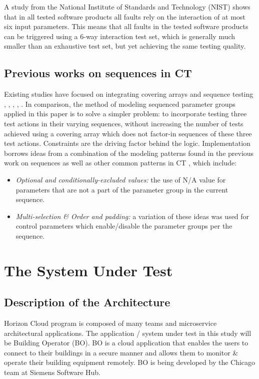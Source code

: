 \documentclass[conference]{IEEEtran}
\begin{document}
	A study from the National Institute of Standards and Technology (NIST) \cite{NISTpractical} shows
	that in all tested software products all faults rely on the interaction of at most six input parameters.
	This means that all faults in the tested software products can be triggered using a $6$-way interaction test set,
	which is generally much smaller than an exhaustive test set, but yet achieving the same testing quality.

	\subsection{Previous works on sequences in CT} \label{Previous works on sequences}
	Existing studies have focused on integrating covering arrays and sequence testing \cite{kuhn2012combinatorial}, \cite{farchi2014combinatorial}, \cite{brain2012event}, \cite{yang2018effect}, \cite{erdem2011answer}.
	In comparison, the method of modeling sequenced parameter groups applied in this paper is to solve a simpler problem:
	to incorporate testing three test actions in their varying sequences, without increasing the number of tests achieved using a covering array which does not factor-in sequences of these three test actions.
	Constraints are the driving factor behind the logic. Implementation borrows ideas from a combination of the modeling patterns found in the previous work on sequences as well as other common patterns in CT \cite{segall2012common}, which include: 
	\begin{itemize}
		\item \textit{Optional and conditionally-excluded values:} the use of N/A value for parameters that are not a part of the parameter group in the current sequence.
		\item	\textit{Multi-selection \& Order and padding:} a variation of these ideas was used for control parameters which enable/disable the parameter groups per the sequence.
	\end{itemize}

\section{The System Under Test}
	\subsection{Description of the Architecture}
	
	Horizon Cloud program is composed of many teams and microservice architectural applications.
	The application / system under test in this study will be Building Operator (BO).
	BO is a cloud application that enables the users to connect to their buildings in a secure manner and allows them to monitor \& operate their building equipment remotely.
	BO is being developed by the Chicago team at Siemens Software Hub. 
\end{document}
